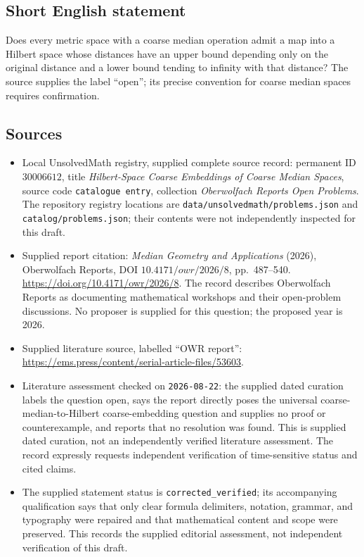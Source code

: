 \documentclass[11pt]{article}
\begin{document}
\subsection{Short English statement}
Does every metric space with a coarse median operation admit a map into a Hilbert space whose distances have an upper bound depending only on the original distance and a lower bound tending to infinity with that distance? The source supplies the label ``open''; its precise convention for coarse median spaces requires confirmation.
\subsection{Sources}
\begin{itemize}
\item Local UnsolvedMath registry, supplied complete source record: permanent ID \(30006612\), title \emph{Hilbert-Space Coarse Embeddings of Coarse Median Spaces}, source code \texttt{catalogue entry}, collection \emph{Oberwolfach Reports Open Problems}. The repository registry locations are \texttt{data/unsolvedmath/problems.json} and \texttt{catalog/problems.json}; their contents were not independently inspected for this draft.
\item Supplied report citation: \emph{Median Geometry and Applications} (2026), Oberwolfach Reports, DOI \(10.4171/owr/2026/8\), pp.\ 487--540. \url{https://doi.org/10.4171/owr/2026/8}. The record describes Oberwolfach Reports as documenting mathematical workshops and their open-problem discussions. No proposer is supplied for this question; the proposed year is 2026.
\item Supplied literature source, labelled ``OWR report'': \url{https://ems.press/content/serial-article-files/53603}.
\item Literature assessment checked on \texttt{2026-08-22}: the supplied dated curation labels the question open, says the report directly poses the universal coarse-median-to-Hilbert coarse-embedding question and supplies no proof or counterexample, and reports that no resolution was found. This is supplied dated curation, not an independently verified literature assessment. The record expressly requests independent verification of time-sensitive status and cited claims.
\item The supplied statement status is \texttt{corrected\_verified}; its accompanying qualification says that only clear formula delimiters, notation, grammar, and typography were repaired and that mathematical content and scope were preserved. This records the supplied editorial assessment, not independent verification of this draft.
\end{itemize}
\end{document}
